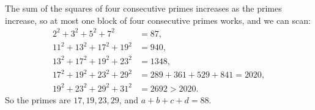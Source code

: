 The sum of the squares of four consecutive primes increases as the primes increase, so at most one block of four consecutive primes works, and we can scan:
\[
\begin{aligned}
2^2+3^2+5^2+7^2&=87,\\
11^2+13^2+17^2+19^2&=940,\\
13^2+17^2+19^2+23^2&=1348,\\
17^2+19^2+23^2+29^2&=289+361+529+841=2020,\\
19^2+23^2+29^2+31^2&=2692>2020 .
\end{aligned}
\]
So the primes are $17,19,23,29$, and $a+b+c+d=\boxed{88}$.

